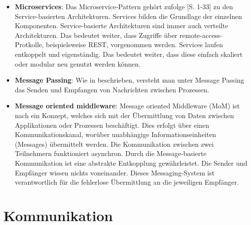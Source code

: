 \begin{itemize}
    \item \textbf{Microservices}: Das Microservice-Pattern gehört zufolge  \cite{microservices}[S. 1-33] zu den Service-basierten Architekturen. Services bilden die Grundlage der einzelnen Komponenten. Ser\-vice-bas\-ierte Architekturen sind immer auch verteilte Architekturen. Das bedeutet weiter, dass Zugriffe über remote-access-Protkolle, beispielsweise REST, vorgenommen werden. Services laufen entkoppelt und eigenständig. Das bedeutet weiter, dass diese einfach skaliert oder modular neu genutzt werden können.
    \item \textbf{Message Passing}: Wie in \cite[S.~5]{message-passing} beschrieben, versteht man unter Message Passing das Senden und Empfangen von Nachrichten zwischen Prozessen.
    \item \textbf{Message oriented middleware}: Message oriented Middleware (MoM) ist nach \cite[S.~77-100]{mim} ein Konzept, welches sich mit der Übermittlung von Daten zwischen Applikationen oder Prozessen beschäftigt. Dies erfolgt über einen Kommunikationskanal, worüber unabhängige In\-for\-ma\-tions\-ein\-hei\-ten (Messages) üb\-er\-mit\-telt werden. Die Kommunikation zwischen zwei Teilnehmern funktioniert asynchron. Durch die Mes\-sage-\-ba\-sier\-te Kommunikation ist eine abstrakte Entkopplung gewährleistet. Die Sender und Empfänger wissen nichts voneinander. Dieses Mess\-aging-System ist verantwortlich für die fehlerlose Üb\-er\-mit\-tlung an die jeweiligen Empfänger.
    
\end{itemize}



\section{Kommunikation}\label{literatur-kommunikation}

